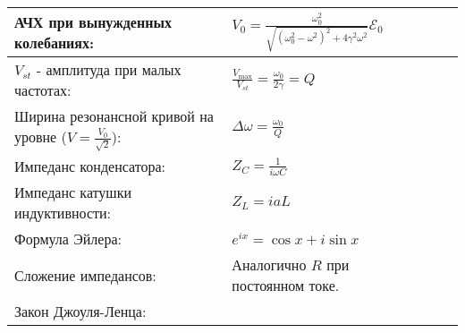 \documentclass{article}
\begin{document}
\begin{tabular}{ |p{6cm}|p{3cm}|p{6cm}|p{3.5cm}|  }
\hline
АЧХ при вынужденных колебаниях:                                            &
$V_{0}=\frac{\omega_{0}^{2}}{\sqrt{\left(\omega_{0}^{2}-\omega^{2}\right)^{2}+4 \gamma^{2} \omega^{2}}} \mathcal{E}_{0}$&
                                                                           &
                                                                           \\
\hline
$V_{st}$ - амплитуда при малых частотах:                                   &
$\frac{V_{\max }}{V_{st}}=\frac{\omega_{0}}{2 \gamma}=Q$                   &
                                                                           &
                                                                           \\
\hline
Ширина резонансной кривой на уровне ($V = \frac{V_0}{\sqrt{2}}$):          &
$\Delta \omega=\frac{\omega_{0}}{Q}$                                       &
                                                                           &
                                                                           \\
\hline
Импеданс конденсатора:                                                     &
$Z_C = \frac{1}{i \omega C}$                                               &
                                                                           &
                                                                           \\
\hline
Импеданс катушки индуктивности:                                            &
$Z_L = i a L$                                                              &
                                                                           &
                                                                           \\
\hline
Формула Эйлера:                                                            &
$e^{i x}=\cos x+i \sin x$                                                  &
                                                                           &
                                                                           \\
\hline
Сложение импедансов:                                                       &
Аналогично $R$ при постоянном токе.                                        &
                                                                           &
                                                                           \\
\hline
Закон Джоуля-Ленца:                                                        &

\end{tabular}
\end{document}

